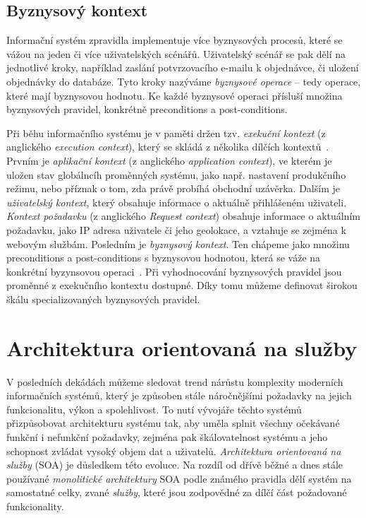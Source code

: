 \subsection{Byznysový kontext}

Informační systém zpravidla implementuje více byznysových procesů, které se vážou
na jeden či více uživatelských scénářů. Uživatelský scénář se pak dělí na jednotlivé
kroky, například zaslání potvrzovacího e-mailu k objednávce, či uložení objednávky
do databáze. Tyto kroky nazýváme \textit{byznysové operace} – tedy operace, které mají
byznysovou hodnotu. Ke každé byznysové operaci přísluší množina byznysových pravidel,
konkrétně preconditions a post-conditions.

Při běhu informačního systému je v paměti držen tzv. \textit{exekuční kontext} (z anglického \textit{execution context}),
který se skládá z několika dílčích kontextů~\cite{cemus2017separation}. Prvním
je \textit{aplikační kontext} (z anglického \textit{application context}), ve kterém je uložen stav globálncíh proměnných systému,
jako např. nastavení produkčního režimu, nebo příznak o tom, zda právě probíhá obchodní
uzávěrka. Dalším je \textit{uživatelský kontext}, který obsahuje informace o aktuálně
přihlášeném uživateli. \textit{Kontext požadavku} (z anglického \textit{Request context}) obsahuje
informace o aktuálním požadavku, jako IP adresa uživatele či jeho geolokace,
a vztahuje se zejména k webovým službám. Posledním je \textit{byznysový kontext}. Ten
chápeme jako množinu preconditions a post-conditions s byznysovou hodnotou, která se
váže na konkrétní byzynsovou operaci~\cite{cemus2015automated}. Při vyhodnocování byznysových pravidel jsou proměnné
z exekučního kontextu dostupné. Díky tomu můžeme definovat širokou škálu specializovaných
byznysových pravidel.

\section{Architektura orientovaná na služby}

V posledních dekádách můžeme sledovat trend nárůstu komplexity
moderních informačních systémů, který je způsoben stále náročnějšími
požadavky na jejich funkcionalitu, výkon a spolehlivost. To nutí
vývojáře těchto systémů přizpůsobovat architekturu systému tak,
aby uměla splnit všechny očekávané funkční i nefunkční požadavky,
zejména pak škálovatelnost systému a jeho schopnost zvládat vysoký
objem dat a uživatelů. \textit{Architektura orientovaná na služby} (SOA) je
důsledkem této evoluce. Na rozdíl od dřívě běžné a dnes
stále používané \textit{monolitické architektury}
SOA podle známého pravidla 
dělí systém na samostatné celky, zvané \textit{služby}, které jsou
zodpovědné za dílčí část požadované funkcionality.

